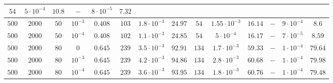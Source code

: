 \documentclass[twocolumn]{svjour3}
\begin{document}
\begin{table*} [!htp]
\begin{center}
\begin{tabular}{|c|c|c|c|c|c|c|c|c|c|c|c|c|c}
\multicolumn{1}{|c}{$54$} & \multicolumn{1}{c}{$5\cdot 10^{-4}$} & \multicolumn{1}{c|}{$10.8$} &
\multicolumn{1}{|c}{$-$} & \multicolumn{1}{c}{$8\cdot 10^{-5}$} & \multicolumn{1}{c}{$7.32$} \\
\hline
\multicolumn{1}{c}{$500$} & \multicolumn{1}{c}{$2000$} & \multicolumn{1}{c}{$50$} & \multicolumn{1}{c|}{$10^{-3}$} & $ 0.408 $ & 
\multicolumn{1}{|c}{$103$} & \multicolumn{1}{c}{$1.8\cdot 10^{-3}$} & \multicolumn{1}{c|}{$24.97$} &
\multicolumn{1}{|c}{$54$} & \multicolumn{1}{c}{$1.55\cdot 10^{-3}$} & \multicolumn{1}{c|}{$16.14$} &
\multicolumn{1}{|c}{$-$} & \multicolumn{1}{c}{$9\cdot 10^{-4}$} & \multicolumn{1}{c}{$8.6$} \\
\hline
\multicolumn{1}{c}{$500$} & \multicolumn{1}{c}{$2000$} & \multicolumn{1}{c}{$50$} & \multicolumn{1}{c|}{$10^{-4}$} & $ 0.408 $ & 
\multicolumn{1}{|c}{$102$} & \multicolumn{1}{c}{$1.1\cdot 10^{-3}$} & \multicolumn{1}{c|}{$24.85$} &
\multicolumn{1}{|c}{$54$} & \multicolumn{1}{c}{$5\cdot 10^{-4}$} & \multicolumn{1}{c|}{$16.17$} &
\multicolumn{1}{|c}{$-$} & \multicolumn{1}{c}{$7\cdot 10^{-5}$} & \multicolumn{1}{c}{$8.59$} \\
\hline
\multicolumn{1}{c}{$500$} & \multicolumn{1}{c}{$2000$} & \multicolumn{1}{c}{$80$} & \multicolumn{1}{c|}{$0$} & $ 0.645 $ & 
\multicolumn{1}{|c}{$239$} & \multicolumn{1}{c}{$3.5\cdot 10^{-3}$} & \multicolumn{1}{c|}{$92.91$} &
\multicolumn{1}{|c}{$134$} & \multicolumn{1}{c}{$1.7\cdot 10^{-3}$} & \multicolumn{1}{c|}{$59.33$} &
\multicolumn{1}{|c}{$-$} & \multicolumn{1}{c}{$1\cdot 10^{-4}$} & \multicolumn{1}{c}{$79.64$} \\
\hline
\multicolumn{1}{c}{$500$} & \multicolumn{1}{c}{$2000$} & \multicolumn{1}{c}{$80$} & \multicolumn{1}{c|}{$10^{-3}$} & $ 0.645 $ & 
\multicolumn{1}{|c}{$239$} & \multicolumn{1}{c}{$4.2\cdot 10^{-3}$} & \multicolumn{1}{c|}{$94.86$} &
\multicolumn{1}{|c}{$134$} & \multicolumn{1}{c}{$2.8\cdot 10^{-3}$} & \multicolumn{1}{c|}{$60.68$} &
\multicolumn{1}{|c}{$-$} & \multicolumn{1}{c}{$1\cdot 10^{-4}$} & \multicolumn{1}{c}{$79.98$} \\
\hline
\multicolumn{1}{c}{$500$} & \multicolumn{1}{c}{$2000$} & \multicolumn{1}{c}{$80$} & \multicolumn{1}{c|}{$10^{-4}$} & $ 0.645 $ & 
\multicolumn{1}{|c}{$239$} & \multicolumn{1}{c}{$3.6\cdot 10^{-3}$} & \multicolumn{1}{c|}{$93.95$} &
\multicolumn{1}{|c}{$134$} & \multicolumn{1}{c}{$1.8\cdot 10^{-3}$} & \multicolumn{1}{c|}{$60.76$} &
\multicolumn{1}{|c}{$-$} & \multicolumn{1}{c}{$1\cdot 10^{-4}$} & \multicolumn{1}{c}{$79.48$} \\

\end{tabular}
\end{center}
\end{table*}
\end{document}
